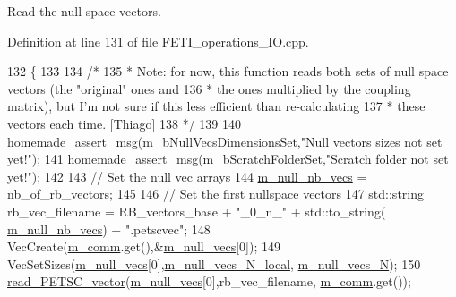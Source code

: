 Read the null space vectors. 



Definition at line 131 of file F\+E\+T\+I\+\_\+operations\+\_\+\+I\+O.\+cpp.


\begin{DoxyCode}
132 \{
133 
134     \textcolor{comment}{/*}
135 \textcolor{comment}{     *      Note: for now, this function reads both sets of null space vectors (the "original" ones and}
136 \textcolor{comment}{     *  the ones multiplied by the coupling matrix), but I'm not sure if this less efficient than
       re-calculating}
137 \textcolor{comment}{     *  these vectors each time. [Thiago]}
138 \textcolor{comment}{     */}
139 
140     \hyperlink{common__header_8h_a593ccc80b790b2268653fcf6597bf451}{homemade\_assert\_msg}(\hyperlink{classcarl_1_1_f_e_t_i___operations_afd921550a2e18db731f244ea40688477}{m\_bNullVecsDimensionsSet},\textcolor{stringliteral}{"Null vectors
       sizes not set yet!"});
141     \hyperlink{common__header_8h_a593ccc80b790b2268653fcf6597bf451}{homemade\_assert\_msg}(\hyperlink{classcarl_1_1_f_e_t_i___operations_a8bb9de7de35a2f7d7d5982ae1085ba15}{m\_bScratchFolderSet},\textcolor{stringliteral}{"Scratch folder not set
       yet!"});
142 
143     \textcolor{comment}{// Set the null vec arrays}
144     \hyperlink{classcarl_1_1_f_e_t_i___operations_a6be71b08544858c4b4609bf2a2927a17}{m\_null\_nb\_vecs} = nb\_of\_rb\_vectors;
145 
146     \textcolor{comment}{// Set the first nullspace vectors}
147     std::string rb\_vec\_filename = RB\_vectors\_base + \textcolor{stringliteral}{"\_0\_n\_"} + std::to\_string(
      \hyperlink{classcarl_1_1_f_e_t_i___operations_a6be71b08544858c4b4609bf2a2927a17}{m\_null\_nb\_vecs}) + \textcolor{stringliteral}{".petscvec"};
148     VecCreate(\hyperlink{classcarl_1_1_f_e_t_i___operations_a8cb0ed286667fc9f3ebc2d8ef2a3e13b}{m\_comm}.get(),&\hyperlink{classcarl_1_1_f_e_t_i___operations_a81ca84aa058155a0a0f586625c6f93b7}{m\_null\_vecs}[0]);
149     VecSetSizes(\hyperlink{classcarl_1_1_f_e_t_i___operations_a81ca84aa058155a0a0f586625c6f93b7}{m\_null\_vecs}[0],\hyperlink{classcarl_1_1_f_e_t_i___operations_a0b7be9a279d71535a43e7c808289f1df}{m\_null\_vecs\_N\_local},
      \hyperlink{classcarl_1_1_f_e_t_i___operations_aa9a450cb613998b62b4af846ff4b0453}{m\_null\_vecs\_N});
150     \hyperlink{namespacecarl_a4d0e2c60b0765dc8182c95362c5d329a}{read\_PETSC\_vector}(\hyperlink{classcarl_1_1_f_e_t_i___operations_a81ca84aa058155a0a0f586625c6f93b7}{m\_null\_vecs}[0],rb\_vec\_filename, 
      \hyperlink{classcarl_1_1_f_e_t_i___operations_a8cb0ed286667fc9f3ebc2d8ef2a3e13b}{m\_comm}.get());

\end{DoxyCode}
